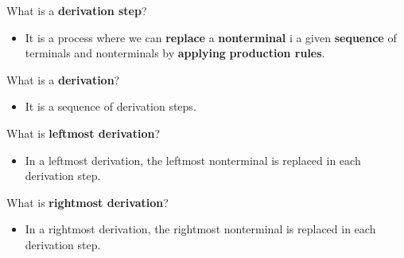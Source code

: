 \documentclass[11pt]{beamer}
\begin{document}
\begin{frame}


\begin{block}{What is a \textbf{derivation step}?}
\begin{itemize}
\item It is a process where we can \textbf{replace} a \textbf{nonterminal} i a given \textbf{sequence} of terminals and nonterminals by \textbf{applying} \textbf{production rules}.
\end{itemize}
\end{block}

\begin{block}{What is a \textbf{derivation}?}
\begin{itemize}
\item It is a sequence of derivation steps.
\end{itemize}
\end{block}

\begin{block}{What is \textbf{leftmost derivation}?}
\begin{itemize}
\item In a leftmost derivation, the leftmost nonterminal is replaced in each derivation step.
\end{itemize}
\end{block}

\begin{block}{What is \textbf{rightmost derivation}?}
\begin{itemize}
\item In a rightmost derivation, the rightmost nonterminal is replaced in each derivation step.
\end{itemize}
\end{block}


\end{frame}
\end{document}
